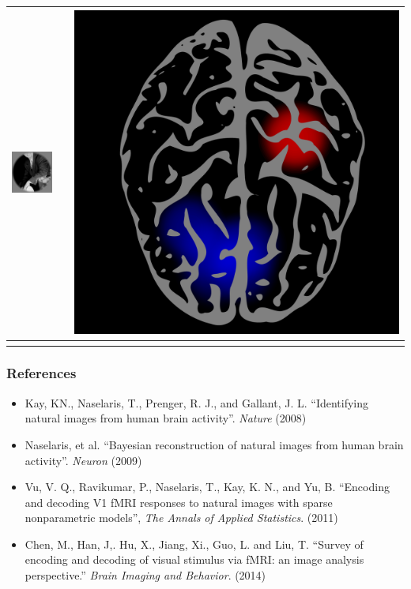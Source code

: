 \documentclass{beamer}
\begin{document}
\begin{frame}
\begin{center}
\begin{tabular}{ccc}
\includegraphics[scale = .3]{img2.png} & \hspace{1in} & \includegraphics[scale = 0.035]{brain2.png} \\ \hline
\hspace{1in} & \hspace{1in} & \hspace{1in}
\end{tabular}
\end{center}
\end{frame}

\begin{frame}
\frametitle{References}
\begin{itemize}
\item Kay, KN., Naselaris, T., Prenger, R. J., and Gallant, J. L.
  ``Identifying natural images from human brain
  activity''. \emph{Nature} (2008)
\item Naselaris, et al. ``Bayesian reconstruction of natural images
  from human brain activity''.  \emph{Neuron} (2009)
\item Vu, V. Q., Ravikumar, P., Naselaris, T., Kay, K. N., and Yu, B.
  ``Encoding and decoding V1 fMRI responses to natural images with
  sparse nonparametric models'', \emph{The Annals of Applied
    Statistics}. (2011)
\item Chen, M., Han, J,. Hu, X., Jiang, Xi., Guo, L. and Liu, T.
  ``Survey of encoding and decoding of visual stimulus via fMRI: an
  image analysis perspective.'' \emph{Brain Imaging and
    Behavior}. (2014)
\end{itemize}
\end{frame}
\end{document}
